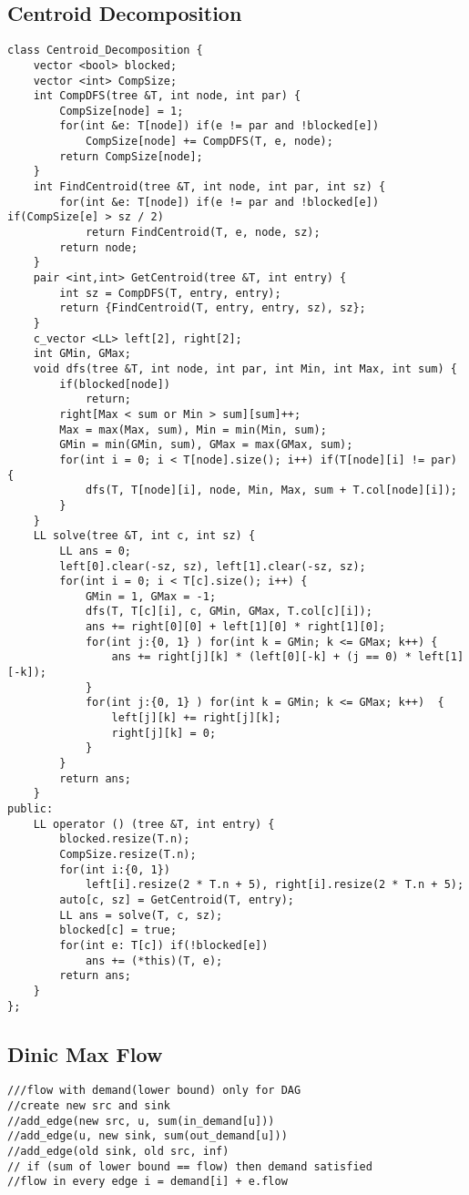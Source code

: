 \documentclass[FSZ,a4paper,onesided]{article}
\begin{document}
\begin{multicols*}{\COLS}
\subsection{Centroid Decomposition}
\begin{lstlisting}
class Centroid_Decomposition {
    vector <bool> blocked;
    vector <int> CompSize;
    int CompDFS(tree &T, int node, int par) {
        CompSize[node] = 1;
        for(int &e: T[node]) if(e != par and !blocked[e])
            CompSize[node] += CompDFS(T, e, node);
        return CompSize[node];
    }
    int FindCentroid(tree &T, int node, int par, int sz) {
        for(int &e: T[node]) if(e != par and !blocked[e]) if(CompSize[e] > sz / 2)
            return FindCentroid(T, e, node, sz);
        return node;
    }
    pair <int,int> GetCentroid(tree &T, int entry) {
        int sz = CompDFS(T, entry, entry);
        return {FindCentroid(T, entry, entry, sz), sz};
    }
    c_vector <LL> left[2], right[2]; 
    int GMin, GMax;
    void dfs(tree &T, int node, int par, int Min, int Max, int sum) {
        if(blocked[node])
            return;
        right[Max < sum or Min > sum][sum]++;
        Max = max(Max, sum), Min = min(Min, sum);
        GMin = min(GMin, sum), GMax = max(GMax, sum);
        for(int i = 0; i < T[node].size(); i++) if(T[node][i] != par) {
            dfs(T, T[node][i], node, Min, Max, sum + T.col[node][i]);
        }
    }
    LL solve(tree &T, int c, int sz) {
        LL ans = 0;
        left[0].clear(-sz, sz), left[1].clear(-sz, sz);
        for(int i = 0; i < T[c].size(); i++) {
            GMin = 1, GMax = -1;
            dfs(T, T[c][i], c, GMin, GMax, T.col[c][i]);
            ans += right[0][0] + left[1][0] * right[1][0];
            for(int j:{0, 1} ) for(int k = GMin; k <= GMax; k++) {
                ans += right[j][k] * (left[0][-k] + (j == 0) * left[1][-k]);
            }
            for(int j:{0, 1} ) for(int k = GMin; k <= GMax; k++)  {
                left[j][k] += right[j][k];
                right[j][k] = 0;
            }
        }
        return ans;
    }
public:
    LL operator () (tree &T, int entry) {
        blocked.resize(T.n);
        CompSize.resize(T.n);
        for(int i:{0, 1})
            left[i].resize(2 * T.n + 5), right[i].resize(2 * T.n + 5);
        auto[c, sz] = GetCentroid(T, entry);
        LL ans = solve(T, c, sz);
        blocked[c] = true;
        for(int e: T[c]) if(!blocked[e])
            ans += (*this)(T, e);
        return ans;
    }   
};\end{lstlisting}
\subsection{Dinic Max Flow}
\begin{lstlisting}
///flow with demand(lower bound) only for DAG
//create new src and sink
//add_edge(new src, u, sum(in_demand[u]))
//add_edge(u, new sink, sum(out_demand[u]))
//add_edge(old sink, old src, inf)
// if (sum of lower bound == flow) then demand satisfied
//flow in every edge i = demand[i] + e.flow


\end{lstlisting}
\end{multicols*}
\end{document}
